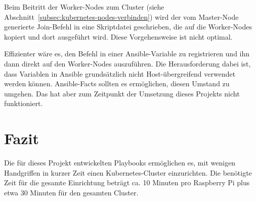 Beim Beitritt der Worker-Nodes zum Cluster (siehe Abschnitt~\ref{subsec:kubernetes-nodes-verbinden}) wird der vom Master-Node generierte Join-Befehl in eine Skriptdatei geschrieben, die auf die Worker-Nodes kopiert und dort ausgeführt wird.
Diese Vorgehensweise ist nicht optimal.

Effizienter wäre es, den Befehl in einer Ansible-Variable zu registrieren und ihn dann direkt auf den Worker-Nodes auszuführen.
Die Herausforderung dabei ist, dass Variablen in Ansible grundsätzlich nicht Host-übergreifend verwendet werden können.
Ansible-Facts sollten es ermöglichen, diesen Umstand zu umgehen.
Das hat aber zum Zeitpunkt der Umsetzung dieses Projekts nicht funktioniert.

\section{Fazit}\label{sec:fazit}

Die für dieses Projekt entwickelten Playbooks ermöglichen es, mit wenigen Handgriffen in kurzer Zeit einen Kubernetes-Cluster einzurichten.
Die benötigte Zeit für die gesamte Einrichtung beträgt ca. 10 Minuten pro Raspberry Pi plus etwa 30 Minuten für den gesamten Cluster.

